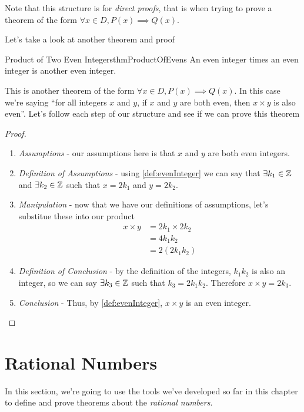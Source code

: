 Note that this structure is for \emph{direct proofs}, that is when trying to prove a theorem of the form $\forall x \in D, P(x) \implies Q(x)$.

Let's take a look at another theorem and proof

\begin{theorem}[label={theorem:productOfEvens}]{Product of Two Even Integers}{thmProductOfEvens}
    An even integer times an even integer is another even integer.
\end{theorem}

This is another theorem of the form $\forall x \in D, P(x) \implies Q(x)$. In this case we're saying ``for all integers $x$ and $y$, if $x$ and $y$ are both even, then $x \times y$ is also even''. Let's follow each step of our structure and see if we can prove this theorem

\begin{proof}
    \begin{enumerate}
        \item \emph{Assumptions} - our assumptions here is that $x$ and $y$ are both even integers.
        \item \emph{Definition of Assumptions} - using \cref{def:evenInteger} we can say that $\exists k_1 \in \mathbb{Z}$ and $\exists k_2 \in \mathbb{Z}$ such that $x = 2k_1$ and $y = 2k_2$.
        \item \emph{Manipulation} - now that we have our definitions of assumptions, let's substitue these into our product
              \begin{align*}
                  x \times y & = 2k_1 \times 2k_2 \\
                             & = 4k_1k_2          \\
                             & = 2(2k_1k_2)
              \end{align*}
        \item \emph{Definition of Conclusion} - by the definition of the integers, $k_1k_2$ is also an integer, so we can say $\exists k_3 \in \mathbb{Z}$ such that $k_3 = 2k_1k_2$. Therefore $x \times y = 2k_3$.
        \item \emph{Conclusion} - Thus, by \cref{def:evenInteger}, $x \times y$ is an even integer.
    \end{enumerate}
\end{proof}

\section{Rational Numbers}
In this section, we're going to use the tools we've developed so far in this chapter to define and prove theorems about the \emph{rational numbers}.


